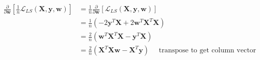 \newcommand{\matrix}[1]{\mathbf{#1}}
\newcommand{\vector}[1]{\mathbf{#1}}
\newcommand{\X}{\matrix{X}}
\newcommand{\y}{\vector{y}}
\newcommand{\w}{\vector{w}}
\begin{align*}
\frac{\partial}{\partial \w} \left[ \frac{1}{n} \mathcal{L}_{LS}(\X,\y,\w) \right] &= \frac{1}{n} \frac{\partial}{\partial \w} \left[ \mathcal{L}_{LS}(\X,\y,\w) \right] \\
&= \frac{1}{n} \left( -2\y^T\X + 2\w^T\X^T\X \right) \\
&= \frac{2}{n} \left( \w^T\X^T\X - \y^T\X \right) \\
&= \frac{2}{n} \left( \X^T\X\w - \X^T\y \right) \quad \text{ transpose to get column vector} \\
\end{align*}
